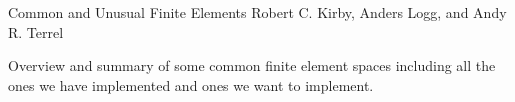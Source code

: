               {Common and Unusual Finite Elements}
              {Robert C. Kirby, Anders Logg, and Andy R. Terrel}

\editornote{[kirby-6]}

Overview and summary of some common finite element spaces including
all the ones we have implemented and ones we want to implement.
